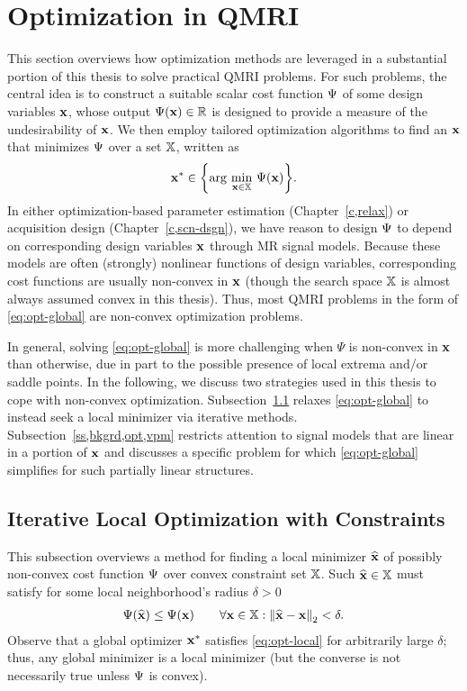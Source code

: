 \section{Optimization in QMRI}
\label{s,bkgrd,opt}

This section overviews 
how optimization methods are leveraged 
in a substantial portion of this thesis 
to solve practical QMRI problems.
For such problems,
the central idea is to construct
a suitable scalar cost function $\Psi$
of some design variables $\mathbf{x}$,
whose output $\costa{\bmx} \in \real$ 
is designed to provide a measure
of the undesirability of $\mathbf{x}$.
We then employ 
tailored optimization algorithms
to find an $\mathbf{x}$
that minimizes $\Psi$
over a set $\mathbb{X}$,
written as
\begin{align}
	\bmx^* \in \set{\argmin{\bmx\in\setX} \costa{\bmx}}.
	\label{eq:opt-global}
\end{align}
In either optimization-based 
parameter estimation (Chapter~\ref{c,relax})
or acquisition design (Chapter~\ref{c,scn-dsgn}),
we have reason to design $\Psi$
to depend on corresponding design variables $\mathbf{x}$ 
through MR signal models.
Because these models are often 
(strongly) nonlinear functions
of design variables,
corresponding cost functions
are usually non-convex in $\mathbf{x}$
(though the search space $\mathbb{X}$ 
is almost always assumed convex
in this thesis).
Thus,
most QMRI problems
in the form of \eqref{eq:opt-global}
are non-convex optimization problems.

In general, 
solving \eqref{eq:opt-global}
is more challenging when 
$\Psi$ is non-convex in $\mathbf{x}$
than otherwise,
due in part to the possible presence
of local extrema and/or saddle points.
In the following, 
we discuss two strategies 
used in this thesis 
to cope with non-convex optimization.
Subsection~\ref{ss,bkgrd,opt,loc}
relaxes \eqref{eq:opt-global}
to instead seek a local minimizer
via iterative methods.
Subsection~\ref{ss,bkgrd,opt,vpm}
restricts attention 
to signal models 
that are linear in a portion of $\mathbf{x}$
and discusses a specific problem
for which \eqref{eq:opt-global} simplifies 
for such partially linear structures.

\subsection{Iterative Local Optimization with Constraints}
\label{ss,bkgrd,opt,loc}

This subsection overviews
a method for finding a local minimizer $\widehat{\mathbf{x}}$
of possibly non-convex cost function $\Psi$
over convex constraint set $\mathbb{X}$.
Such $\widehat{\mathbf{x}} \in \mathbb{X}$ must satisfy
for some local neighborhood's radius $\delta>0$
\begin{align}
	\costa{\est{\bmx}} \leq \costa{\bmx} \qquad
		\forall \bmx \in \setX : \norm{\est{\bmx}-\bmx}_2 < \delta.
		\label{eq:opt-local}
\end{align}	
Observe that
a global optimizer $\mathbf{x}^*$ 
satisfies \eqref{eq:opt-local}
for arbitrarily large $\delta$;
thus, any global minimizer 
is a local minimizer
(but the converse is not necessarily true
unless $\Psi$ is convex).

